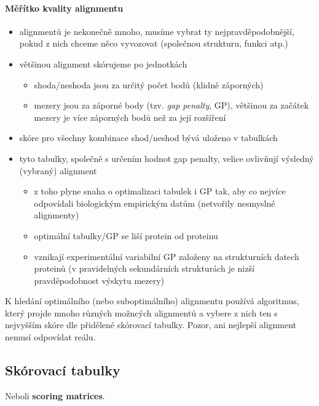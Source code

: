 \documentclass[DIV=8]{scrreprt}
\begin{document}
\paragraph{Měřítko kvality alignmentu}
\begin{itemize}[nosep]
    \item alignmentů je nekonečně mnoho, musíme vybrat ty nejpravděpodobnější, pokud z nich chceme něco vyvozovat (společnou strukturu, funkci atp.)
    \item většinou alignment skórujeme po jednotkách
\begin{itemize}[nosep]
    \item shoda/neshoda jsou za určitý počet bodů (klidně záporných)
    \item mezery jsou za záporné body (tzv. \emph{gap penalty}, GP), většinou za začátek mezery je více záporných bodů než za její rozšíření
\end{itemize}

    \item skóre pro všechny kombinace shod/neshod bývá uloženo v tabulkách
    \item tyto tabulky, společně s určením hodnot gap penalty, velice ovlivňují výsledný (vybraný) alignment
\begin{itemize}[nosep]
    \item z toho plyne snaha o optimalizaci tabulek i GP tak, aby co nejvíce odpovídali biologickým empirickým datům (netvořily nesmyslné alignmenty)
    \item optimální tabulky/GP se liší protein od proteinu
    \item vznikají experimentální variabilní GP založeny na strukturních datech proteinů (v pravidelných sekundárních strukturách je nizší pravděpodobnost výskytu mezery)
\end{itemize}

\end{itemize}



K hledání optimálního (nebo suboptimálního) alignmentu používá algoritmus, který projde mnoho různých možncých alignmentů a vybere z nich ten s nejvyšším skóre dle přidělené skórovací tabulky. Pozor, ani nejlepší alignment nemusí odpovídat reálu.

\subsection{Skórovací tabulky} \label{Skórovací tabulky}


Neboli \textbf{scoring matrices}.
\end{document}
